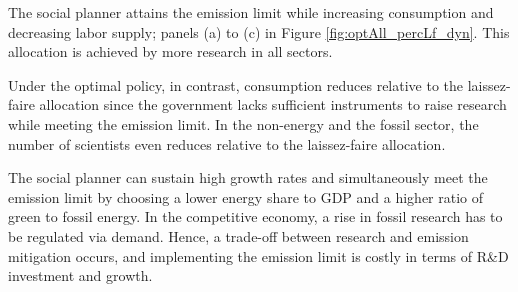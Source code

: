 \begin{figure}[h!!!]
\begin{subfigure}[]{0.4\textwidth}
	\end{subfigure}
\end{figure} 
%
The social planner attains the emission limit while increasing consumption and decreasing labor supply; panels (a) to (c) in Figure \ref{fig:optAll_percLf_dyn}. This allocation is achieved by more research in all sectors. 

Under the optimal policy, in contrast, consumption reduces relative to the laissez-faire allocation since the government lacks sufficient instruments to raise research while meeting the emission limit. In the non-energy and the fossil sector, the number of scientists even reduces relative to the laissez-faire allocation.

The social planner can sustain  high growth rates and simultaneously meet the emission limit by choosing a lower energy share to GDP and a higher ratio of green to fossil energy. 
In the competitive economy, a rise in fossil research has to be regulated via demand. Hence, a trade-off between research and emission mitigation occurs, and implementing the emission limit is costly in terms of R\&D investment and growth. 


